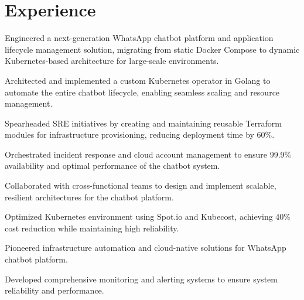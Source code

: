 \documentclass[]{deedy-resume-pdflatex}
\begin{document}
\begin{minipage}[t]{0.65\textwidth} 


\section{Experience}


\vspace{\topsep} %
\begin{tightemize}
\item Engineered a next-generation WhatsApp chatbot platform and application lifecycle management solution, migrating from static Docker Compose to dynamic Kubernetes-based architecture for large-scale environments.
\item Architected and implemented a custom Kubernetes operator in Golang to automate the entire chatbot lifecycle, enabling seamless scaling and resource management.
\item Spearheaded SRE initiatives by creating and maintaining reusable Terraform modules for infrastructure provisioning, reducing deployment time by 60\%.
\item Orchestrated incident response and cloud account management to ensure 99.9\% availability and optimal performance of the chatbot system.
\item Collaborated with cross-functional teams to design and implement scalable, resilient architectures for the chatbot platform.
\item Optimized Kubernetes environment using Spot.io and Kubecost, achieving 40\% cost reduction while maintaining high reliability.
\end{tightemize}
\sectionsep


\vspace{\topsep} %
\begin{tightemize}
\item Pioneered infrastructure automation and cloud-native solutions for WhatsApp chatbot platform.
\item Developed comprehensive monitoring and alerting systems to ensure system reliability and performance.
\end{tightemize}
\sectionsep


\end{minipage}
\end{document}
